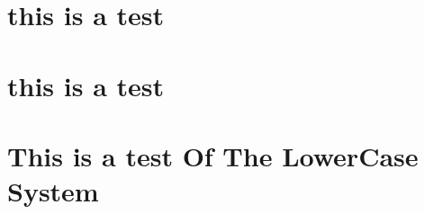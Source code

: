 \documentclass[a4paper,twoside]{article}
\begin{document}
\begin{equation}
    
\end{equation}

\section{this is a test }

\label{sec:this_is_a_test_}

\section{this is a test}

\label{sec:this_is_a_test}

\section{This is a test Of The LowerCase System}
\label{sec:this_is_a_test_of_the_lowercase_system}
\end{document}

